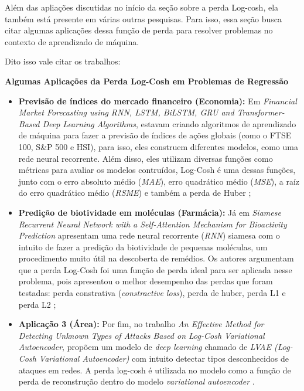 Além das apliações discutidas no início da seção sobre a perda Log-cosh, ela também está presente em várias outras pesquisas. Para isso, essa seção busca citar algumas aplicações dessa função de perda para resolver problemas no contexto de aprendizado de máquina.

Dito isso vale citar os trabalhos:

\textbf{Algumas Aplicações da Perda Log-Cosh em Problemas de Regressão} 
\vspace{1em}

\begin{itemize}
    \item \textbf{Previsão de índices do mercado financeiro (Economia):} Em \textit{Financial Market Forecasting using RNN, LSTM, BiLSTM, GRU and Transformer-Based Deep Learning Algorithms}, \textcite{FinantialMarketForecastingUsingRNN} estavam criando algoritmos de aprendizado de máquina para fazer a previsão de índices de ações globais (como o FTSE 100, S\&P 500 e HSI), para isso, eles construem diferentes modelos, como uma rede neural recorrente. Além disso, eles utilizam diversas funções como métricas para avaliar os modelos contruídos, Log-Cosh é uma dessas funções, junto com o erro absoluto médio (\textit{MAE}), erro quadrático médio (\textit{MSE}), a raíz do erro quadrático médio (\textit{RSME}) e também a perda de Huber \parencite{FinantialMarketForecastingUsingRNN};
    \item \textbf{Predição de biotividade em moléculas (Farmácia):} Já em \textit{Siamese Recurrent Neural Network with a Self-Attention Mechanism for Bioactivity Prediction} \textcite{SiameseRecurrentNeuralNetwork} apresentam uma rede neural recorrente (\textit{RNN}) siamesa com o intuito de fazer a predição da biotividade de pequenas moléculas, um procedimento muito útil na descoberta de remédios. Os autores argumentam que a perda Log-Cosh foi uma função de perda ideal para ser aplicada nesse problema, pois apresentou o melhor desempenho das perdas que foram testadas: perda constrativa (\textit{constractive loss}), perda de huber, perda L1 e perda L2 \parencite{SiameseRecurrentNeuralNetwork};
    \item \textbf{Aplicação 3 (Área):} Por fim, no trabalho \textit{An Effective Method for Detecting Unknown Types of Attacks Based on Log-Cosh Variational Autoencoder}, \textcite{AnEffectiveMethodForDetectingUnknowTypes} propõem um modelo de \textit{deep learning} chamado de \textit{LVAE (Log-Cosh Variational Autoencoder)} com intuito detectar tipos desconhecidos de ataques em redes. A perda log-cosh é utilizada no modelo como a função de perda de reconstrução dentro do modelo \textit{variational autoencoder} \parencite{AnEffectiveMethodForDetectingUnknowTypes}.
\end{itemize}

